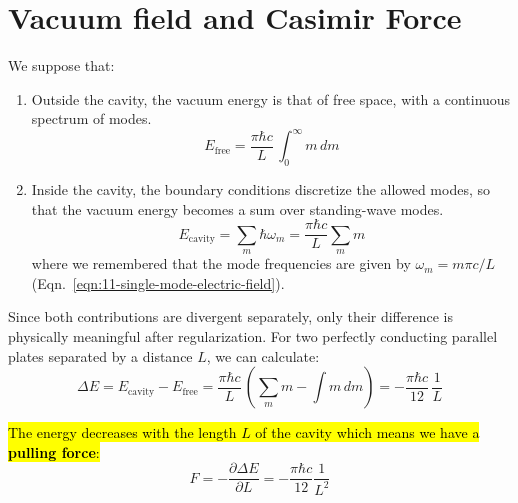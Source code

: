 \section{Vacuum field and Casimir Force}\label{sec:vacuum-and-casimir}


We suppose that:
\begin{enumerate}
    \item Outside the cavity, the vacuum energy is that of free space, with a continuous spectrum of modes.
    \begin{equation}\label{eqn:12-continuous-free-space-energy}
    E_\text{free} = \frac{\pi \hbar c}{L} \, \int_0^{\infty} m \, dm 
    \end{equation}
    
    \item Inside the cavity, the boundary conditions discretize the allowed modes, so that the vacuum energy becomes a sum over standing-wave modes.
    \begin{equation}\label{eqn:12-discrete-cavity-energy}
        E_\text{cavity} = \sum_m \hbar \omega_m = \frac{\pi\hbar c}{L} \sum_m m
    \end{equation}
    where we remembered that the mode frequencies are given by $\omega_m = m \pi c / L$ (Eqn.~\ref{eqn:11-single-mode-electric-field}).
\end{enumerate}

Since both contributions are divergent separately, only their difference is physically meaningful after regularization. For two perfectly conducting parallel plates separated by a distance $L$, we can calculate:
\[
\Delta E= E_\text{cavity}-E_\text{free} = 
\frac{\pi \hbar c}{L}\, 
\left(\sum_mm-\int m \, dm  \right) = 
 -\frac{\pi\hbar c}{12}\, \frac{1}{L}
\]

\hl{The energy decreases with the length $L$ of the cavity which means we have a \textbf{pulling force}:}
\begin{equation}\label{eqn:12-casimir-force}
    F = -\frac{\partial\Delta E}{\partial L} = -\frac{\pi \hbar c}{12}\frac{1}{L^2}
\end{equation}

